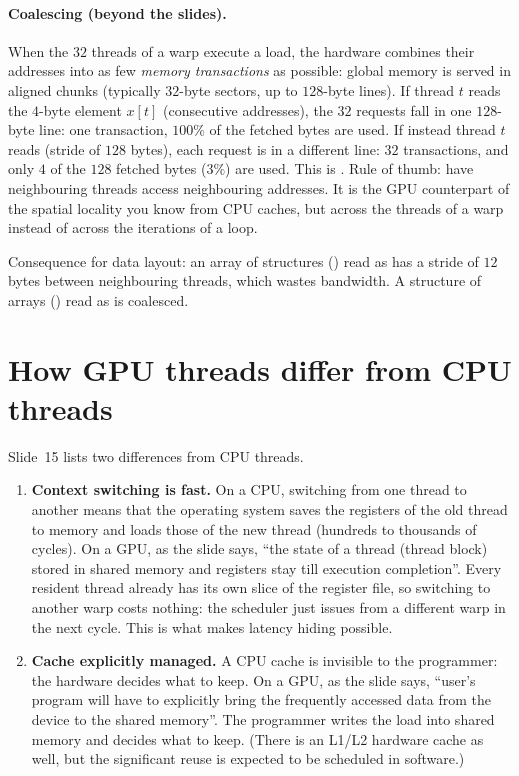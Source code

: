 \paragraph{Coalescing (beyond the slides).}
When the $32$ threads of a warp execute a load, the hardware combines their addresses into as few \emph{memory transactions} as possible: global memory is served in aligned chunks (typically $32$-byte sectors, up to $128$-byte lines).
If thread $t$ reads the $4$-byte element $x[t]$ (consecutive addresses), the $32$ requests fall in one $128$-byte line: one transaction, $100\%$ of the fetched bytes are used.
If instead thread $t$ reads  (stride of $128$ bytes), each request is in a different line: $32$ transactions, and only $4$ of the $128$ fetched bytes ($3\%$) are used.
This is . Rule of thumb: have neighbouring threads access neighbouring addresses. It is the GPU counterpart of the spatial locality you know from CPU caches, but across the threads of a warp instead of across the iterations of a loop.

\begin{pitfall}
Consequence for data layout: an array of structures () read as  has a stride of $12$ bytes between neighbouring threads, which wastes bandwidth.
A structure of arrays () read as  is coalesced.
\end{pitfall}

\section{How GPU threads differ from CPU threads}
\label{sec:cpuvsgpu}


Slide~15 lists two differences from CPU threads.

\begin{enumerate}
  \item \textbf{Context switching is fast.} On a CPU, switching from one thread to another means that the operating system saves the registers of the old thread to memory and loads those of the new thread (hundreds to thousands of cycles).
        On a GPU, as the slide says, ``the state of a thread (thread block) stored in shared memory and registers stay till execution completion''. Every resident thread already has its own slice of the register file, so switching to another warp costs nothing: the scheduler just issues from a different warp
        in the next cycle. This is what makes latency hiding possible.
  \item \textbf{Cache explicitly managed.} A CPU cache is invisible to the programmer: the hardware decides what to keep. On a GPU, as the slide says, ``user's program will have to explicitly bring the frequently accessed data from the device to the shared memory''. The programmer writes the load into shared memory and decides what to keep.
        (There is an L1/L2 hardware cache as well, but the significant reuse is expected to be scheduled in software.)
\end{enumerate}

